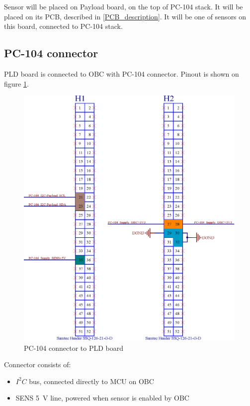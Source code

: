     Sensor will be placed on Payload board, on the top of PC-104 stack. It will be placed on its PCB, described in \ref{PCB_description}. It will be one of sensors on this board, connected to PC-104 stack.


\subsection{PC-104 connector}
    PLD board is connected to OBC with PC-104 connector. Pinout is shown on figure \ref{PC104_PLD}.

    \begin{figure}[H]
        \centering
        \includegraphics[width=0.5\paperwidth]{img/PC-104.eps}
        \caption{PC-104 connector to PLD board}
        \label{PC104_PLD}
    \end{figure}

    Connector consists of:
    \begin{itemize}
        \item $I^2C$ bus, connected directly to MCU on OBC
        \item SENS \SI{5}{\volt} line, powered when sensor is enabled by OBC
    \end{itemize}


